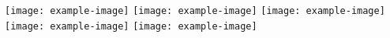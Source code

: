 \documentclass{standalone}
\begin{document}
\texttt{[image: example-image]}%
\texttt{[image: example-image]}%
\texttt{[image: example-image]}%
\texttt{[image: example-image]}%
\texttt{[image: example-image]}
\end{document}
